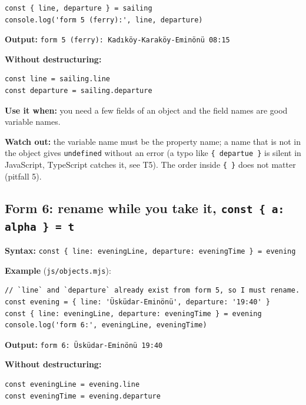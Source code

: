 \documentclass[
  10pt,
]{article}
\begin{document}
\begin{verbatim}
const { line, departure } = sailing
console.log('form 5 (ferry):', line, departure)
\end{verbatim}

\textbf{Output:}
\texttt{form 5 (\allowbreak{}ferry):\allowbreak{} Kadıköy-Karaköy-Eminönü 08:\allowbreak{}15}

\textbf{Without destructuring:}

\begin{verbatim}
const line = sailing.line
const departure = sailing.departure
\end{verbatim}

\textbf{Use it when:} you need a few fields of an object and the field
names are good variable names.

\textbf{Watch out:} the variable name must be the property name; a name
that is not in the object gives \texttt{undefined} without an error (a
typo like \texttt{\{ departue \}} is silent in JavaScript, TypeScript
catches it, see T5). The order inside \texttt{\{ \}} does not matter
(pitfall 5).

\hypertarget{form-6-rename-while-you-take-it-const--a-alpha---t}{%
\subsection{\texorpdfstring{Form 6: rename while you take it,
\texttt{const \{ a:\allowbreak{} alpha \} =\allowbreak{} t}}{Form 6: rename while you take it, }}\label{form-6-rename-while-you-take-it-const--a-alpha---t}}

\textbf{Syntax:}
\texttt{const \{ line:\allowbreak{} eveningLine,\allowbreak{} departure:\allowbreak{} eveningTime \} =\allowbreak{} evening}

\textbf{Example} (\texttt{js/\allowbreak{}objects.\allowbreak{}mjs}):

\begin{verbatim}
// `line` and `departure` already exist from form 5, so I must rename.
const evening = { line: 'Üsküdar-Eminönü', departure: '19:40' }
const { line: eveningLine, departure: eveningTime } = evening
console.log('form 6:', eveningLine, eveningTime)
\end{verbatim}

\textbf{Output:}
\texttt{form 6:\allowbreak{} Üsküdar-Eminönü 19:\allowbreak{}40}

\textbf{Without destructuring:}

\begin{verbatim}
const eveningLine = evening.line
const eveningTime = evening.departure
\end{verbatim}
\end{document}
